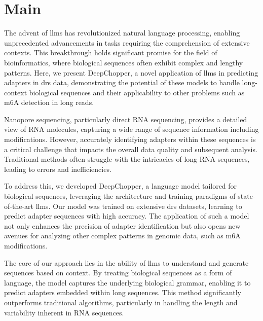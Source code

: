 \documentclass[pdflatex, sn-mathphys-num, lineno]{sn-jnl}%
\newcommand{\chopper}{DeepChopper}
\theoremstyle{thmstyleone}%
\theoremstyle{thmstyletwo}%
\theoremstyle{thmstylethree}%
\begin{document}
\maketitle

\section{Main}\label{sec1}


The advent of \glspl{llm} has revolutionized natural language processing, enabling unprecedented advancements in tasks requiring the comprehension of extensive contexts.
This breakthrough holds significant promise for the field of bioinformatics, where biological sequences often exhibit complex and lengthy patterns.
Here, we present \chopper, a novel application of \glspl{llm} in predicting adapters in \gls{drs} data, demonstrating the potential of these models to handle long-context biological sequences and their applicability to other problems such as m6A detection in long reads.

Nanopore sequencing, particularly direct RNA sequencing, provides a detailed view of RNA molecules, capturing a wide range of sequence information including modifications.
However, accurately identifying adapters within these sequences is a critical challenge that impacts the overall data quality and subsequent analysis.
Traditional methods often struggle with the intricacies of long RNA sequences, leading to errors and inefficiencies.

To address this, we developed \chopper, a language model tailored for biological sequences, leveraging the architecture and training paradigms of state-of-the-art \glspl{llm}.
Our model was trained on extensive \gls{drs} datasets, learning to predict adapter sequences with high accuracy.
The application of such a model not only enhances the precision of adapter identification but also opens new avenues for analyzing other complex patterns in genomic data, such as m6A modifications.

The core of our approach lies in the ability of \glspl{llm} to understand and generate sequences based on context.
By treating biological sequences as a form of language, the model captures the underlying biological grammar, enabling it to predict adapters embedded within long sequences.
This method significantly outperforms traditional algorithms, particularly in handling the length and variability inherent in RNA sequences.
\end{document}
